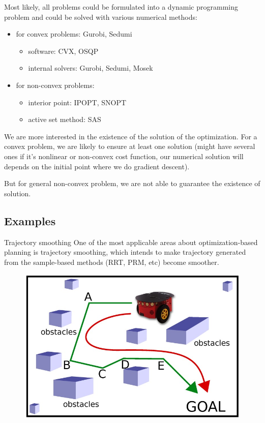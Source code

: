 \documentclass{beamer}
\begin{document}
\begin{frame}
	Most likely, all problems could be formulated into a dynamic programming problem and could be solved with various numerical methods:
	\begin{itemize}
		\item for convex problems: Gurobi, Sedumi
		\begin{itemize}
			\item software: CVX, OSQP
			\item internal solvers: Gurobi, Sedumi, Mosek  
		\end{itemize}
		\item for non-convex problems:
		\begin{itemize}
			\item interior point: IPOPT, SNOPT
			\item active set method: SAS
		\end{itemize}
	\end{itemize}

	We are more interested in the existence of the solution of the optimization. For a convex problem, we are likely to ensure at least one solution (might have several ones if it's nonlinear or non-convex cost function, our numerical solution will depends on the initial point where we do gradient descent).
	
	But for general non-convex problem, we are not able to guarantee the existence of solution. 
\end{frame}

\subsection{Examples}
\begin{frame}{Trajectory smoothing}
	One of the most applicable areas about optimization-based planning is trajectory smoothing, which intends to make trajectory generated from the sample-based methods (RRT, PRM, etc) become smoother.
	\begin{figure}
		\includegraphics[width=0.5\linewidth]{figures/trajectory-smooth.jpg}
	\end{figure}
\end{frame}
\end{document}
